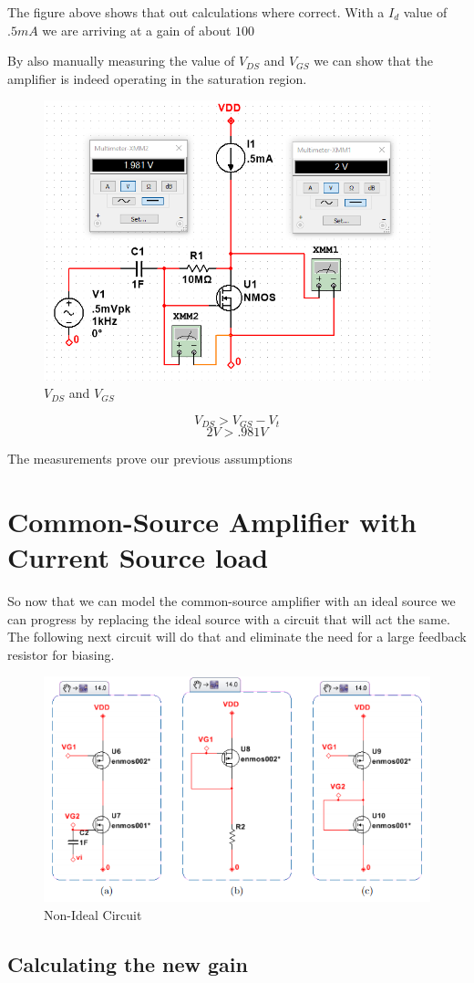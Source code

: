 \documentclass[12pt]{article}
\begin{document}
The figure above shows that out calculations where correct. With a $I_d$ value of $.5mA$ we are arriving at a gain of about $100$

By also manually measuring the value of $V_{DS}$ and $V_{GS}$ we can show that the amplifier is indeed operating in the saturation region.

\begin{figure}[h]
	\label{fig:amp}
	\caption{$V_{DS}$ and $V_{GS}$}
	\centering
	\includegraphics[width=.4\textwidth]{vgs}
\end{figure}

$$V_{DS} > V_{GS}- V_t$$
$$2V > .981V$$

The measurements prove our previous assumptions

\section{Common-Source Amplifier with Current Source load}
So now that we can model the common-source amplifier with an ideal source we can progress by replacing the ideal source with a circuit that will act the same. The following next circuit will do that and eliminate the need for a large feedback resistor for biasing.

\begin{figure}[h]
	\label{fig:amp}
	\caption{Non-Ideal Circuit}
	\centering
	\includegraphics[width=.5\textwidth]{nonideal}
\end{figure}

\subsection{Calculating the new gain}
\end{document}
